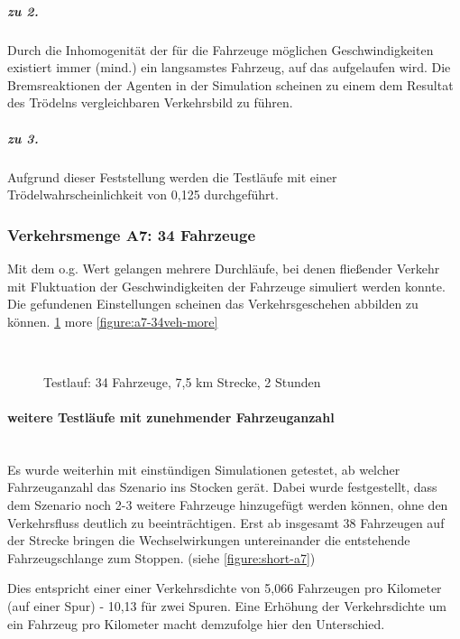 \subparagraph*{zu 2.} Durch die Inhomogenität der für die Fahrzeuge möglichen Geschwindigkeiten existiert immer (mind.) ein langsamstes Fahrzeug, auf das aufgelaufen wird.
Die Bremsreaktionen der Agenten in der Simulation scheinen zu einem dem Resultat des Trödelns vergleichbaren Verkehrsbild zu führen.

\subparagraph*{zu 3.} Aufgrund dieser Feststellung werden die Testläufe mit einer Trödelwahrscheinlichkeit von 0,125 durchgeführt.



\subsubsection{Verkehrsmenge A7: 34 Fahrzeuge}
\label{sec:szenario-a7}

Mit dem o.g. Wert gelangen mehrere Durchläufe, bei denen fließender Verkehr mit Fluktuation der Geschwindigkeiten der Fahrzeuge simuliert werden konnte.
Die gefundenen Einstellungen scheinen das Verkehrsgeschehen abbilden zu können.
\cref{figure:testrun-34veh-7ko5km}
more \cref{figure:a7-34veh-more}

\begin{figure}[hptb]
  \centering 
    \\
  \caption{Testlauf: 34 Fahrzeuge, 7,5 km Strecke, 2 Stunden} 
  \label{figure:testrun-34veh-7ko5km}
\end{figure}

\paragraph*{weitere Testläufe mit zunehmender Fahrzeuganzahl}
\hfill \\

Es wurde weiterhin mit einstündigen Simulationen getestet, ab welcher Fahrzeuganzahl das Szenario ins Stocken gerät.
Dabei wurde festgestellt, dass dem Szenario noch 2-3 weitere Fahrzeuge hinzugefügt werden können, ohne den Verkehrsfluss deutlich zu beeinträchtigen.
Erst ab insgesamt 38 Fahrzeugen auf der Strecke bringen die Wechselwirkungen untereinander die entstehende Fahrzeugschlange zum Stoppen. (siehe \cref{figure:short-a7})

Dies entspricht einer einer Verkehrsdichte von 5,066 Fahrzeugen pro Kilometer (auf einer Spur) - 10,13 für zwei Spuren.
Eine Erhöhung der Verkehrsdichte um ein Fahrzeug pro Kilometer macht demzufolge hier den Unterschied.




